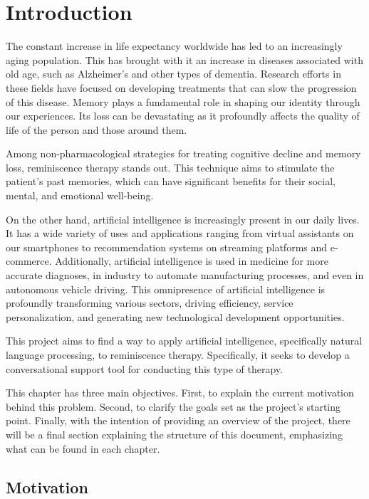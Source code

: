 \chapter*{Introduction}
\label{chap:introduction}


The constant increase in life expectancy worldwide has led to an increasingly aging population. This has brought with it an increase in diseases associated with old age, such as Alzheimer's and other types of dementia. Research efforts in these fields have focused on developing treatments that can slow the progression of this disease. Memory plays a fundamental role in shaping our identity through our experiences. Its loss can be devastating as it profoundly affects the quality of life of the person and those around them.

Among non-pharmacological strategies for treating cognitive decline and memory loss, reminiscence therapy stands out. This technique aims to stimulate the patient's past memories, which can have significant benefits for their social, mental, and emotional well-being.

On the other hand, artificial intelligence is increasingly present in our daily lives. It has a wide variety of uses and applications ranging from virtual assistants on our smartphones to recommendation systems on streaming platforms and e-commerce. Additionally, artificial intelligence is used in medicine for more accurate diagnoses, in industry to automate manufacturing processes, and even in autonomous vehicle driving. This omnipresence of artificial intelligence is profoundly transforming various sectors, driving efficiency, service personalization, and generating new technological development opportunities.

This project aims to find a way to apply artificial intelligence, specifically natural language processing, to reminiscence therapy. Specifically, it seeks to develop a conversational support tool for conducting this type of therapy.

This chapter has three main objectives. First, to explain the current motivation behind this problem. Second, to clarify the goals set as the project's starting point. Finally, with the intention of providing an overview of the project, there will be a final section explaining the structure of this document, emphasizing what can be found in each chapter.

\section{Motivation}

